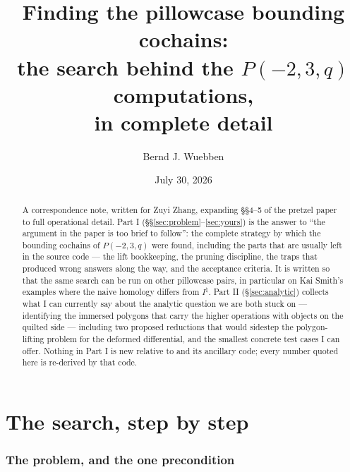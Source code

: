 \documentclass[11pt,reqno]{amsart}
\theoremstyle{plain}
\theoremstyle{definition}
\newcommand{\Inat}{I^{\natural}}
\begin{document}
\title[Finding the pillowcase bounding cochains]{Finding the pillowcase bounding cochains:\\
the search behind the $P(-2,3,q)$ computations,\\ in complete detail}

\author{Bernd J. Wuebben}
\date{July 30, 2026}

\begin{abstract}
A correspondence note, written for Zuyi Zhang, expanding \S\S4--5 of the pretzel paper
\cite{P2} to full operational detail. Part I (\S\S\ref{sec:problem}--\ref{sec:yours}) is the
answer to ``the argument in the paper is too brief to follow'': the complete strategy by which
the bounding cochains of $P(-2,3,q)$ were found, including the parts that are usually left in
the source code --- the lift bookkeeping, the pruning discipline, the traps that produced wrong
answers along the way, and the acceptance criteria. It is written so that the same search can
be run on other pillowcase pairs, in particular on Kai Smith's examples \cite{Smi} where the
naive homology differs from $\Inat$. Part II (\S\ref{sec:analytic}) collects what I can currently say about
the analytic question we are both stuck on --- identifying the immersed polygons that carry the
higher operations with objects on the quilted side --- including two proposed reductions that
would sidestep the polygon-lifting problem for the deformed differential, and the smallest
concrete test cases I can offer. Nothing in Part I is new relative to \cite{P2} and its
ancillary code; every number quoted here is re-derived by that code.
\end{abstract}

\maketitle

\tableofcontents

\part{The search, step by step}

\section{The problem, and the one precondition}\label{sec:problem}
\end{document}
